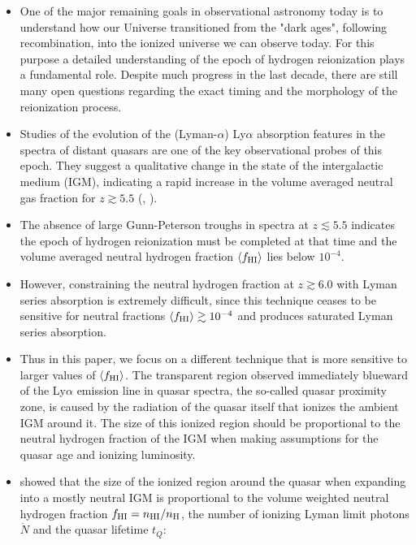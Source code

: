 \documentclass[iop]{emulateapj}
\newcommand{\lya} {Ly$\alpha$\xspace}
\newcommand{\hii} {\ion{H}{2}\xspace}
\begin{document}
\begin{itemize}
\item One of the major remaining goals in observational astronomy today is to understand how our Universe transitioned from the "dark ages", following recombination, into the ionized universe we can observe today. For this purpose a detailed understanding of the epoch of hydrogen reionization plays a fundamental role. Despite much progress in the last decade, there are still many open questions regarding the exact timing and the morphology of the reionization process. 
\item Studies of the evolution of the (Lyman-$\alpha$) \lya absorption features in the spectra of distant quasars are one of the key observational probes of this epoch. They suggest a qualitative change in the state of the intergalactic medium (IGM), indicating a rapid increase in the volume averaged neutral gas fraction for $z\gtrsim 5.5$ (\citet{Fan2006}, \citet{Becker2015}). 
\item The absence of large Gunn-Peterson troughs in spectra at $z\lesssim 5.5$ indicates the epoch of hydrogen reionization must be completed at that time and the volume averaged neutral hydrogen fraction $\langle f_{\rm HI}\rangle$ lies below $10^{-4}$\citep{Carilli2010}. 
\item However, constraining the neutral hydrogen fraction at $z\gtrsim 6.0$ with Lyman series absorption is extremely difficult, since this technique ceases to be sensitive for neutral fractions $\langle f_{\rm HI}\rangle \gtrsim 10^{-4}$ and produces saturated Lyman series absorption. 
\item Thus in this paper, we focus on a different technique that is more sensitive to larger values of $\langle f_{\rm HI}\rangle$. The transparent region observed immediately blueward of the \lya emission line in quasar spectra, the so-called quasar proximity zone, is caused by the radiation of the quasar itself that ionizes the ambient IGM around it. The size of this ionized \hii region should be proportional to the neutral hydrogen fraction of the IGM when making assumptions for the quasar age and ionizing luminosity. 
\item \citet{BoltonHaehnelt2006} showed that the size of the ionized region around the quasar when expanding into a mostly neutral IGM is proportional to the volume weighted neutral hydrogen fraction $f_{\rm HI}=n_{\rm HI}/n_{\rm H}$, the number of ionizing Lyman limit photons $\dot{N}$ and the quasar lifetime $t_Q$:
\begin{align}

\end{align}
\end{itemize}
\end{document}
